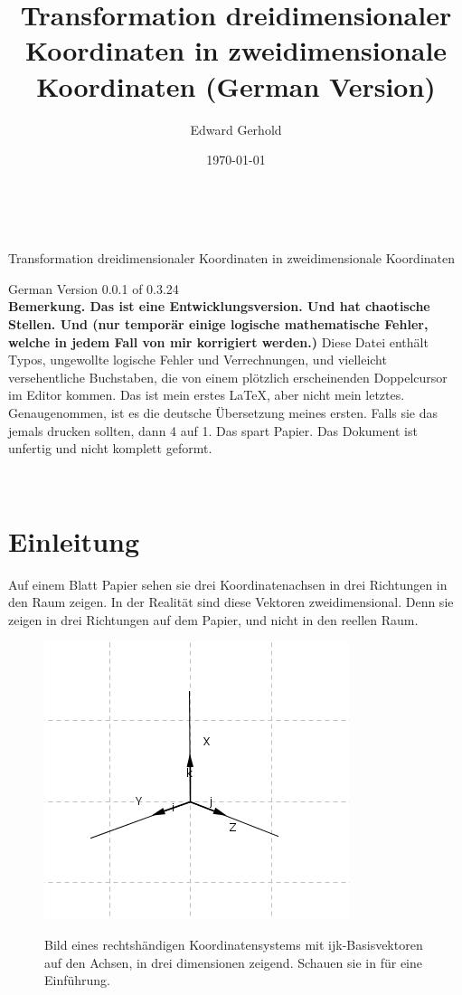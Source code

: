 \documentclass[a4paper]{article}
\begin{document}
\begin{center}
\title{Transformation dreidimensionaler Koordinaten in zweidimensionale Koordinaten (German Version)}\\
\author{Edward Gerhold}
Transformation dreidimensionaler Koordinaten in zweidimensionale Koordinaten
\date{\today}
\maketitle


German Version 0.0.1 of 0.3.24\\

\textbf{Bemerkung. Das ist eine Entwicklungsversion. Und hat chaotische Stellen. Und (nur tempor\"ar einige logische mathematische Fehler, welche in jedem Fall von mir korrigiert werden.)} Diese Datei enth\"alt Typos, ungewollte logische Fehler und Verrechnungen, und vielleicht versehentliche Buchstaben, die von einem plötzlich erscheinenden Doppelcursor im Editor kommen. Das ist mein erstes \LaTeX, aber nicht mein letztes. Genaugenommen, ist es die deutsche \"Ubersetzung meines ersten. Falls sie das jemals drucken sollten, dann 4 auf 1. Das spart Papier. Das Dokument ist unfertig und nicht komplett geformt.

\end{center} 

\tableofcontents\\

\section{Einleitung}

Auf einem Blatt Papier sehen sie drei Koordinatenachsen in drei Richtungen in den Raum zeigen.
In der Realit\"at sind diese Vektoren zweidimensional. Denn sie zeigen in drei Richtungen auf
dem Papier, und nicht in den reellen Raum.\\

\begin{figure}[ht]
\label{ijksystem}
\includegraphics[scale=2]{ijksystem.png}\\
\caption{Bild eines rechtsh\"andigen Koordinatensystems mit ijk-Basisvektoren auf den Achsen, in drei dimensionen zeigend. Schauen sie in \cite{Corral1} f\"ur eine Einf\"uhrung.}
\end{figure}
\end{document}

